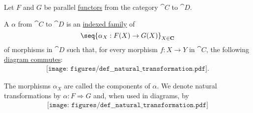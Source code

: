 \begin{definition}\label{def:natural_transformation}
  Let \( F \) and \( G \) be parallel \hyperref[def:functor]{functors} from the category \( \cat{C} \) to \( \cat{D} \).

  A  \( \alpha \) from \( \cat{C} \) to \( \cat{D} \) is an \hyperref[def:tuple_and_cartesian_product/indexed_family]{indexed family} of
  \begin{equation}\label{eq:def:natural_transformation/family}
    \seq{ \alpha_X: F(X) \to G(X) }_{X \in \cat{C}}
  \end{equation}
  of morphisms in \( \cat{D} \) such that, for every morphism \( f: X \to Y \) in \( \cat{C} \), the following \hyperref[def:categorical_diagram]{diagram commutes}:
  \begin{equation}\label{eq:def:natural_transformation/diagram}
    \begin{aligned}
      \texttt{[image: figures/def\_\_natural\_transformation.pdf]}.
    \end{aligned}
  \end{equation}

  The morphisms \( \alpha_X \) are called the components of \( \alpha \). We denote natural transformations by \( \alpha: F \Rightarrow G \) and, when used in diagrams, by
  \begin{equation}\label{eq:def:natural_transformation/notation}
    \begin{aligned}
      \texttt{[image: figures/def\_\_natural\_transformation.pdf]}
    \end{aligned}
  \end{equation}
\end{definition}

